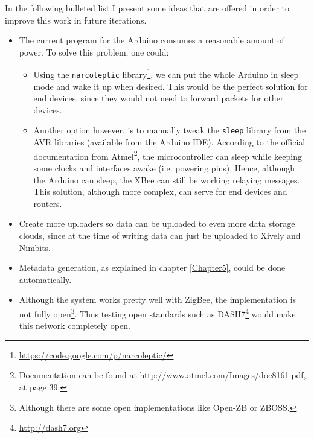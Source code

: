 In the following bulleted list I present some ideas that are offered in order to improve this work in future iterations.

\begin{itemize}
    \item The current program for the Arduino consumes a reasonable amount of power. To solve this problem, one could:
        \begin{itemize}
            \item Using the \texttt{narcoleptic} library\footnote{\url{https://code.google.com/p/narcoleptic/}}, we can put the whole Arduino in sleep mode and wake it up when desired. This would be the perfect solution for end devices, since they would not need to forward packets for other devices.
            \item Another option however, is to manually tweak the \texttt{sleep} library from the AVR libraries (available from the Arduino IDE). According to the official documentation from Atmel\footnote{Documentation can be found at \url{http://www.atmel.com/Images/doc8161.pdf}, at page 39.}, the microcontroller can sleep while keeping some clocks and interfaces awake (i.e. powering pins). Hence, although the Arduino can sleep, the XBee can still be working relaying messages. This solution, although more complex, can serve for end devices and routers.
        \end{itemize}
    \item Create more uploaders so data can be uploaded to even more data storage clouds, since at the time of writing data can just be uploaded to Xively and Nimbits.
    \item Metadata generation, as explained in chapter \ref{Chapter5}, could be done automatically.
    \item Although the system works pretty well with ZigBee, the implementation is not fully open\footnote{Although there are some open implementations like Open-ZB or ZBOSS.}. Thus testing open standards such as DASH7\footnote{\url{http://dash7.org}} would make this network completely open.
\end{itemize}
